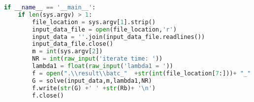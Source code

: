 \begin{lstlisting}[language = Python]
if __name__ == '__main__':
	if len(sys.argv) > 1:
		file_location = sys.argv[1].strip()		
		input_data_file = open(file_location,'r')
		input_data = ''.join(input_data_file.readlines())
		input_data_file.close()
		m = int(sys.argv[2])
		NR = int(raw_input('iterate time: '))
		lambda1 = float(raw_input('lambda1 = '))
		f = open(".\\result\\batc_"  +str(int(file_location[7:]))+ "_" + str(m) + "_" + str(lambda1),'w')
		G = solve(input_data,m,lambda1,NR)
		f.write(str(G) +' ' +str(Rb)+ '\n')
		f.close()
\end{lstlisting}